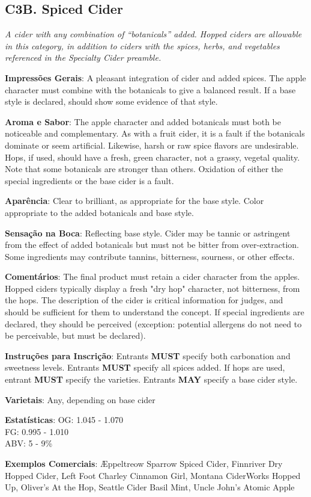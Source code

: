 \subsection*{C3B. Spiced Cider}

\textit{A cider with any combination of “botanicals” added. Hopped ciders are allowable in this category, in addition to ciders with the spices, herbs, and vegetables referenced in the Specialty Cider preamble.}

\textbf{Impressões Gerais}: A pleasant integration of cider and added spices. The apple character must combine with the botanicals to give a balanced result. If a base style is declared, should show some evidence of that style.

\textbf{Aroma e Sabor}: The apple character and added botanicals must both be noticeable and complementary. As with a fruit cider, it is a fault if the botanicals dominate or seem artificial. Likewise, harsh or raw spice flavors are undesirable. Hops, if used, should have a fresh, green character, not a grassy, vegetal quality. Note that some botanicals are stronger than others. Oxidation of either the special ingredients or the base cider is a fault.

\textbf{Aparência}: Clear to brilliant, as appropriate for the base style. Color appropriate to the added botanicals and base style.

\textbf{Sensação na Boca}: Reflecting base style. Cider may be tannic or astringent from the effect of added botanicals but must not be bitter from over-extraction. Some ingredients may contribute tannins, bitterness, sourness, or other effects.

\textbf{Comentários}: The final product must retain a cider character from the apples. Hopped ciders typically display a fresh "dry hop" character, not bitterness, from the hops. The description of the cider is critical information for judges, and should be sufficient for them to understand the concept. If special ingredients are declared, they should be perceived (exception: potential allergens do not need to be perceivable, but must be declared).

\textbf{Instruções para Inscrição}: Entrants \textbf{MUST} specify both carbonation and sweetness levels. Entrants \textbf{MUST} specify all spices added. If hops are used, entrant \textbf{MUST} specify the varieties. Entrants \textbf{MAY} specify a base cider style.

\textbf{Varietais}: Any, depending on base cider

\textbf{Estatísticas}: OG: 1.045 - 1.070 \\
\phantom{ } \hspace{16.5mm} FG: 0.995 - 1.010 \\
\phantom{ } \hspace{16.5mm} ABV: 5 - 9\%

\textbf{Exemplos Comerciais}: Æppeltreow Sparrow Spiced Cider, Finnriver Dry Hopped Cider, Left Foot Charley Cinnamon Girl, Montana CiderWorks Hopped Up, Oliver's At the Hop, Seattle Cider Basil Mint, Uncle John's Atomic Apple